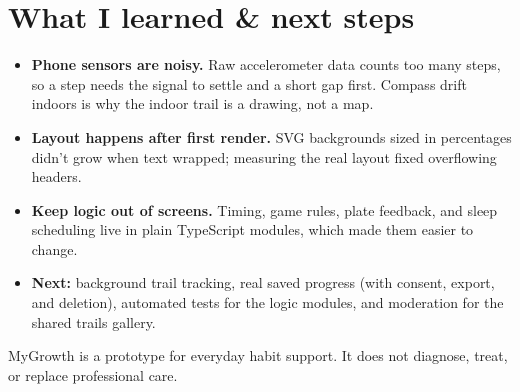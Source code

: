 \documentclass[11pt,a4paper]{article}
\newcommand{\project}[3]{%
  \par\noindent
  \tikz\node[fill=#1, rounded corners=10pt, inner sep=14pt,
             text width=\dimexpr\linewidth-28pt\relax, align=left, text=white]{%
    {\scriptsize\bfseries PROJECT}\par\vspace{2pt}
    {\LARGE\bfseries #2}\par\vspace{3pt}
    {\small #3}};\par\vspace{6pt}
}
\begin{document}
\section{What I learned \& next steps}

\begin{itemize}
  \item \textbf{Phone sensors are noisy.} Raw accelerometer data counts too
        many steps, so a step needs the signal to settle and a short gap first.
        Compass drift indoors is why the indoor trail is a drawing, not a map.
  \item \textbf{Layout happens after first render.} SVG backgrounds sized in
        percentages didn't grow when text wrapped; measuring the real layout
        fixed overflowing headers.
  \item \textbf{Keep logic out of screens.} Timing, game rules, plate
        feedback, and sleep scheduling live in plain TypeScript modules, which
        made them easier to change.
  \item \textbf{Next:} background trail tracking, real saved progress (with
        consent, export, and deletion), automated tests for the logic
        modules, and moderation for the shared trails gallery.
\end{itemize}

{\footnotesize\color{muted} MyGrowth is a prototype for everyday habit
support. It does not diagnose, treat, or replace professional care.}

\end{document}
